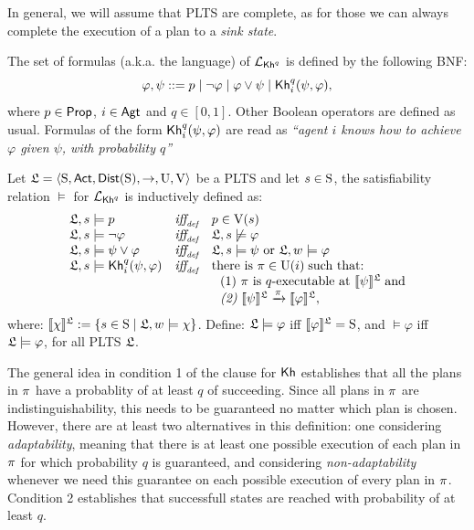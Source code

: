 In general, we will assume that PLTS are complete, as for those we can always complete the execution of a plan to a \emph{sink state}.

\begin{definition}
    \label{def:syntax}
    The set of formulas (a.k.a. the language) of $\PKh$ is defined by the following BNF:
    \[
        \varphi, \psi ::= p \mid \neg \varphi \mid \varphi \vee \psi \mid \kh_i^q(\psi,\varphi),
    \]
    where $p\in\PROP$, $i\in\AGT$ and $q\in[0,1]$. Other Boolean operators are defined as usual. Formulas of the form $\kh_i^q(\psi,\varphi)$ are read as \emph{``agent $i$ knows how to achieve $\varphi$ given $\psi$, with probability $q$''}
\end{definition}

\begin{definition} \label{def:semantics}
    Let $\model = \tup{\S,\ACT,\dist(\S),\ra,\Unc,\V}$ be a PLTS and let $s\in\S$, the satisfiability relation $\models$ for $\PKh$ is inductively defined as:
    \[
    \begin{array}{l@{\ \ \ }c@{\ \ \  }l}
    \model, s \models p & \iffdef & p \in \V(s) \\
    \model, s\models \neg\varphi & \iffdef & \model, s \not\models \varphi \\
    \model, s \models \psi\vee\varphi & \iffdef & \model, s \models \psi \mbox{ or }\model, w \models \varphi \\
    \model, s \models \kh_i^q(\psi,\varphi) & \iffdef & \text{there is } \plans \in \Unc(i) \;\text{such that:} \\
    & & \ \ \text{\rm (1)} \ \plans \text{ is $q$-executable at }  \truthset{\model}{\psi}\; \text{and} \\
    & & \ \ \text{\em (2)} \ \truthset{\model}{\psi} \reach{\plans} \truthset{\model}{\varphi}, 
    \end{array}
    \]     
    \noindent where: $\truthset{\model}{\chi} := \csetsc{s\in\S}{\model,w\models\chi}$. Define: $\model\models\varphi$ iff  $\truthset{\model}{\varphi}=\S$, and $\models\varphi$ iff $\model\models\varphi$, for all PLTS $\model$.
\end{definition}

The general idea in condition 1 of the clause for $\kh$ establishes that all the plans in $\plans$ have a probablity of at least $q$ of succeeding. Since all plans in $\plans$ are indistinguishability, this needs to be guaranteed no matter which plan is chosen. However, there are at least two alternatives in this definition: one considering \emph{adaptability}, meaning that there is at least one possible execution of each plan in $\plans$ for which probability $q$ is guaranteed, and considering \emph{non-adaptability} whenever we need this guarantee on each possible execution of every plan in $\plans$. Condition 2 establishes that successfull states are reached with probability of at least $q$.

